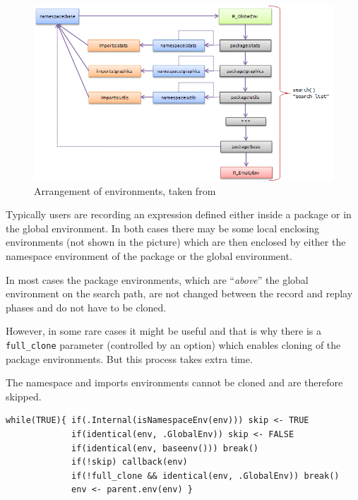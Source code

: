 \documentclass[thesis=M,english,hidelinks]{FITthesis}[2012/10/20]
\newcommand*{\qt}[1]{\enquote{{\itshape#1}}}
\begin{document}
			\begin{figure}[ht]\centering
				\includegraphics[width=1.0\textwidth]{img/environments}
				\caption{Arrangement of environments, taken from \cite{environments}}\label{fig:environments}
			\end{figure}
			
			Typically users are recording an expression defined either inside a package or in the global environment. In both cases there may be some local enclosing environments (not shown in the picture) which are then enclosed by either the namespace environment of the package or the global environment.\par
			
			In most cases the package environments, which are \qt{above} the global environment on the search path, are not changed between the record and replay phases and do not have to be cloned.\par
			
			However, in some rare cases it might be useful and that is why there is a \lstinline|full_clone| parameter (controlled by an option) which enables cloning of the package environments. But this process takes extra time.\par
			
			The namespace and imports environments cannot be cloned and are therefore skipped.\par
			
\begin{lstlisting}[style=filestyle, caption={The \lstinline|iterate_environments()| function}]
while(TRUE){ if(.Internal(isNamespaceEnv(env))) skip <- TRUE
             if(identical(env, .GlobalEnv)) skip <- FALSE
             if(identical(env, baseenv())) break()
             if(!skip) callback(env)
             if(!full_clone && identical(env, .GlobalEnv)) break()
             env <- parent.env(env) }
\end{lstlisting}
		
\end{document}
